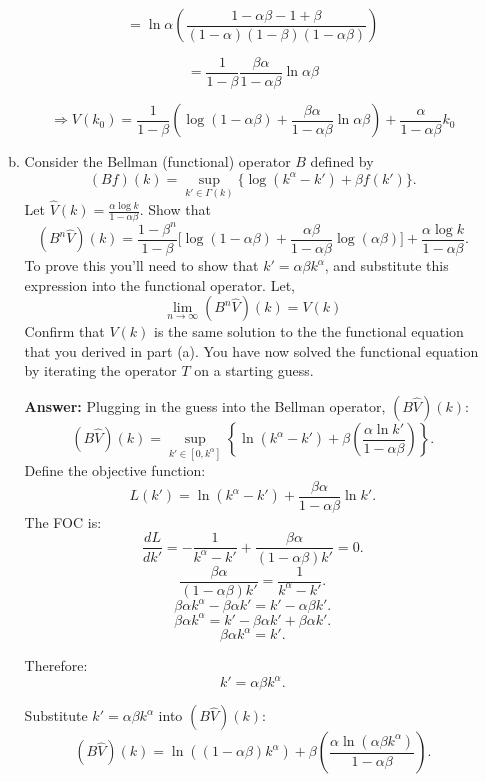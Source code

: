 \documentclass[11pt]{extarticle}
\theoremstyle{plain}
\theoremstyle{definition}
\begin{document}
\begin{enumerate}[(a)]
\begin{enumerate}[(a)]
\[
= \ln \alpha \left( \frac{1 - \alpha \beta - 1 + \beta}{(1 - \alpha)(1 - \beta)(1 - \alpha \beta)} \right)
\]

\[
= \frac{1}{1 - \beta} \frac{\beta \alpha}{1 - \alpha \beta} \ln \alpha \beta
\]

\[
\Rightarrow V(k_0) = \frac{1}{1 - \beta} \left( \log (1 - \alpha \beta) + \frac{\beta \alpha}{1 - \alpha \beta} \ln \alpha \beta \right) +  \frac{\alpha}{1 - \alpha \beta} k_0
\]



\item Consider the Bellman (functional) operator $B$ defined by
\begin{equation*}
	(B f)(k) = \sup_{k' \in \Gamma(k)} \Big\{ \log (k^\alpha - k') + \beta f(k') \Big\}.
\end{equation*}
Let $\hat V(k) = \frac{\alpha \log k}{1 - \alpha \beta}$. Show that
\begin{equation*}
	(B^n \hat V)(k) = \frac{1-\beta^n}{1-\beta} \bigg[\log (1-\alpha \beta) + \frac{\alpha \beta}{1 - \alpha \beta} \log (\alpha \beta) \bigg] + \frac{\alpha \log k}{1 - \alpha \beta}.
\end{equation*}
To prove this you'll need to show that $k' = \alpha \beta k^\alpha$, and substitute this expression into the functional operator. Let,
\begin{equation*}
	\lim_{n \rightarrow \infty} (B^n \hat V)(k) = V(k)
\end{equation*}
Confirm that $V(k)$ is the same solution to the the functional equation that you derived in part (a). You have now solved the functional equation by iterating the operator $T$ on a starting guess.

\textbf{Answer:} 
Plugging in the guess into the Bellman operator, $(B \hat{V})(k)$:
\[
(B \hat{V})(k) = \sup_{k' \in [0, k^\alpha]} \left\{ \ln (k^\alpha - k') + \beta \left( \frac{\alpha \ln k'}{1 - \alpha \beta} \right) \right\}.
\]
Define the objective function:
\[
L(k') = \ln (k^\alpha - k') + \frac{\beta \alpha}{1 - \alpha \beta} \ln k'.
\]
The FOC is:
\[
\frac{dL}{dk'} = -\frac{1}{k^\alpha - k'} + \frac{\beta \alpha}{(1 - \alpha \beta) k'} = 0.
\]
\[
\frac{\beta \alpha}{(1 - \alpha \beta) k'} = \frac{1}{k^\alpha - k'}.
\]
\[
\beta \alpha k^\alpha - \beta \alpha k' = k' - \alpha \beta k'.
\]
\[
\beta \alpha k^\alpha = k' - \beta \alpha k' + \beta \alpha k'.
\]
\[
\beta \alpha k^\alpha = k'.
\]

Therefore:
\[
k' = \alpha \beta k^\alpha.
\]

Substitute $k' = \alpha \beta k^\alpha$ into $(B \hat{V})(k)$:
\[
(B \hat{V})(k) = \ln \left( (1 - \alpha \beta) k^\alpha \right) + \beta \left( \frac{\alpha \ln (\alpha \beta k^\alpha)}{1 - \alpha \beta} \right).
\]


\end{enumerate}
\end{enumerate}
\end{document}
